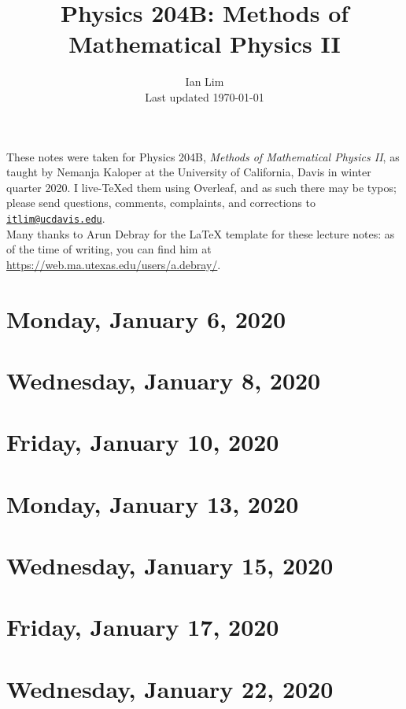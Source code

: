 \documentclass{../mynotes}
\begin{document}
\title{Physics 204B: Methods of Mathematical Physics II}
\author{Ian Lim\\ Last updated \today}
\maketitle
{\small\noindent These notes were taken for Physics 204B, \emph{Methods of Mathematical Physics II}, as taught by Nemanja Kaloper at the University of California, Davis in winter quarter 2020. I live-\TeX ed them using Overleaf, and as such there may be typos; please send questions, comments, complaints, and corrections to 
\href{mailto:itlim@ucdavis.edu?subject=204B\%20Lecture\%20Notes}{\texttt{itlim@ucdavis.edu}}.\\
Many thanks to Arun Debray for the {\LaTeX} template for these lecture notes: as of the time of writing, you can find him at \url{https://web.ma.utexas.edu/users/a.debray/}.}

\tableofcontents

\section{Monday, January 6, 2020}
	
\section{Wednesday, January 8, 2020}
    
\section{Friday, January 10, 2020}
    

\section{Monday, January 13, 2020}
	
\section{Wednesday, January 15, 2020}
    
\section{Friday, January 17, 2020}
    

\section{Wednesday, January 22, 2020}
    
\end{document}
